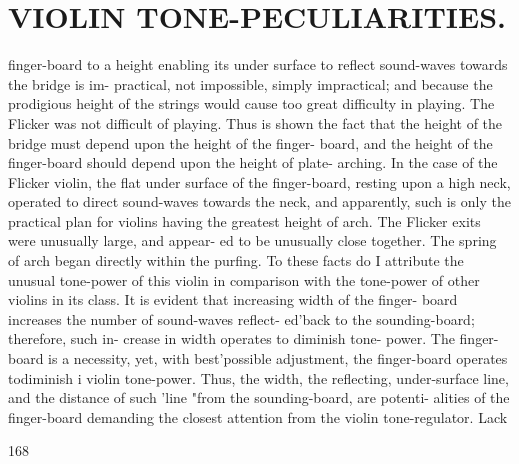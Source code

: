 \documentclass{article}
\begin{document}
\section*{VIOLIN TONE-PECULIARITIES.}
finger-board to a height enabling its under surface to reflect sound-waves towards the bridge is im- practical, not impossible, simply impractical; and because the prodigious height of the strings would cause too great difficulty in playing. The Flicker was not difficult of playing. Thus is shown the fact that the height of the bridge must depend upon the height of the finger- board, and the height of the finger-board should depend upon the height of plate- arching. In the case of the Flicker violin, the flat under surface of the finger-board, resting upon a high neck, operated to direct sound-waves towards the neck, and apparently, such is only the practical plan for violins having the greatest height of arch. The Flicker exits were unusually large, and appear- ed to be unusually close together. The spring of arch began directly within the purfing. To these facts do I attribute the unusual tone-power of this violin in comparison with the tone-power of other violins in its class. It is evident that increasing width of the finger- board increases the number of sound-waves reflect- ed'back to the sounding-board; therefore, such in- crease in width operates to diminish tone- power. The finger-board is a necessity, yet, with best'possible adjustment, the finger-board operates todiminish i violin tone-power. Thus, the width, the reflecting, under-surface line, and the distance of such 'line "from the sounding-board, are potenti- alities of the finger-board demanding the closest attention from the violin tone-regulator. Lack

168
\end{document}
